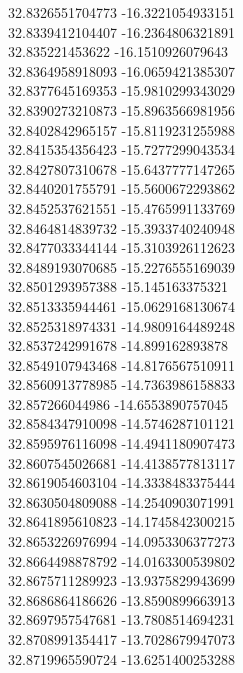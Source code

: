 {32.8326551704773	-16.3221054933151\\
32.8339412104407	-16.2364806321891\\
32.835221453622	-16.1510926079643\\
32.8364958918093	-16.0659421385307\\
32.8377645169353	-15.9810299343029\\
32.8390273210873	-15.8963566981956\\
32.8402842965157	-15.8119231255988\\
32.8415354356423	-15.7277299043534\\
32.8427807310678	-15.6437777147265\\
32.8440201755791	-15.5600672293862\\
32.8452537621551	-15.4765991133769\\
32.8464814839732	-15.3933740240948\\
32.8477033344144	-15.3103926112623\\
32.8489193070685	-15.2276555169039\\
32.8501293957388	-15.145163375321\\
32.8513335944461	-15.0629168130674\\
32.8525318974331	-14.9809164489248\\
32.8537242991678	-14.899162893878\\
32.8549107943468	-14.8176567510911\\
32.8560913778985	-14.7363986158833\\
32.857266044986	-14.6553890757045\\
32.8584347910098	-14.5746287101121\\
32.8595976116098	-14.4941180907473\\
32.8607545026681	-14.4138577813117\\
32.8619054603104	-14.3338483375444\\
32.8630504809088	-14.2540903071991\\
32.8641895610823	-14.1745842300215\\
32.8653226976994	-14.0953306377273\\
32.8664498878792	-14.0163300539802\\
32.8675711289923	-13.9375829943699\\
32.8686864186626	-13.8590899663913\\
32.8697957547681	-13.7808514694231\\
32.8708991354417	-13.7028679947073\\
32.8719965590724	-13.6251400253288\\
}
